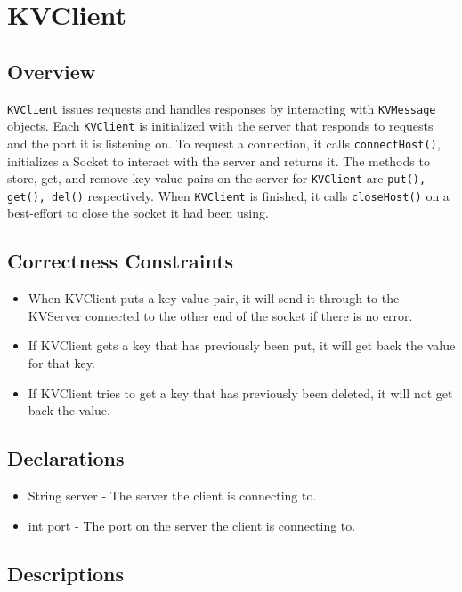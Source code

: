 \section{KVClient}

\subsection{Overview}
\texttt{KVClient} issues requests and handles responses by interacting with \texttt{KVMessage} objects. Each \texttt{KVClient} is initialized with the server that responds to requests and the port it is listening on. To request a connection, it calls \texttt{connectHost()}, initializes a Socket to interact with the server and returns it. The methods to store, get, and remove key-value pairs on the server for \texttt{KVClient} are \texttt{put(), get(), del()} respectively. When \texttt{KVClient} is finished, it calls \texttt{closeHost()} on a best-effort to close the socket it had been using.

\subsection{Correctness Constraints}
\begin{itemize}
\item When KVClient puts a key-value pair, it will send it through to the KVServer connected to the other end of the socket if there is no error.
\item If KVClient gets a key that has previously been put, it will get back the value for that key.
\item If KVClient tries to get a key that has previously been deleted, it will not get back the value.
\end{itemize}

\subsection{Declarations}
\begin{itemize}
\item String server - The server the client is connecting to.
\item int port - The port on the server the client is connecting to.
\end{itemize}
\subsection{Descriptions}

